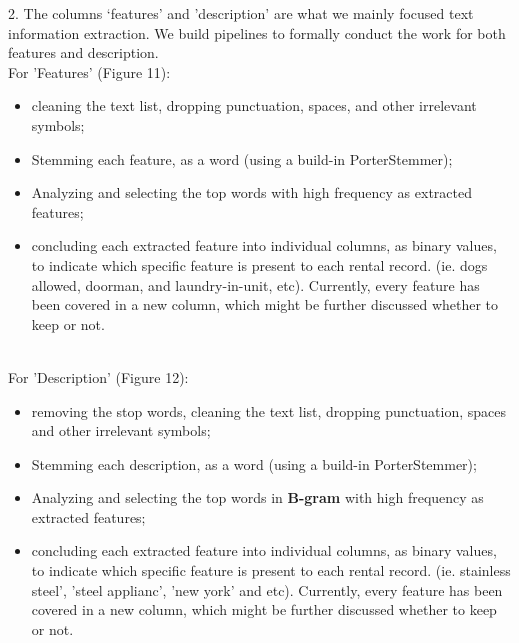 \documentclass[12pt,twocolumn,letterpaper]{article}
\begin{document}
\begin{figure}[h!]%
    \centering
    \qquad
    \caption{}%
    \label{fig:example}%
\end{figure}


2. The columns ‘features’ and 'description' are what we mainly focused text information extraction. We build pipelines to formally conduct the work for both features and description. 
\\ For 'Features' (Figure 11):
\begin{itemize}
  \item cleaning the text list, dropping punctuation, spaces, and other irrelevant symbols;
  \item Stemming each feature, as a word (using a build-in PorterStemmer);
  \item Analyzing and selecting the top words with high frequency as extracted features;
  \item concluding each extracted feature into individual columns, as binary values, to indicate which specific feature is present to each rental record. (ie. dogs allowed, doorman, and laundry-in-unit, etc). Currently, every feature has been covered in a new column, which might be further discussed whether to keep or not.
\end{itemize}


\\ For 'Description' (Figure 12):
\begin{itemize}
  \item removing the stop words, cleaning the text list, dropping punctuation, spaces and other irrelevant symbols;
  \item Stemming each description, as a word (using a build-in PorterStemmer);
  \item Analyzing and selecting the top words in {\bf B-gram} with high frequency as extracted features;
  \item concluding each extracted feature into individual columns, as binary values, to indicate which specific feature is present to each rental record. (ie. stainless steel', 'steel applianc', 'new york' and etc). Currently, every feature has been covered in a new column, which might be further discussed whether to keep or not.
\end{itemize}
\end{document}

